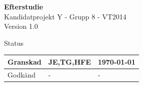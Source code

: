 \documentclass[a4paper,12pt,fleqn]{article}
\begin{document}
	\pagestyle{empty}
	\vspace*{\fill}
		\begingroup
			\begin{center}
				\huge{\textbf{Efterstudie}}
				\\
				\vspace{5pt}
				\normalsize
				Kandidatprojekt Y - Grupp 8 - VT2014
				\\
				Version 1.0
				\end{center}
		\endgroup
	 
	\vspace{15pt}
	\vspace*{\fill}
	
	\begin{center} %
		Status
		\\
		\vspace{3pt} %
	    \begin{tabular}{| p{3cm} | p{3cm} | p{3cm} |} %
	    \hline %
	    Granskad & JE,TG,HFE & \today \\ \hline %
		Godkänd & - & - \\ \hline %

	    \end{tabular}
	\end{center}
	\vspace{2cm}
	\newpage
	
\end{document}
